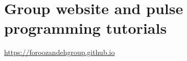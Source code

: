 \section{Group website and pulse programming tutorials}
\label{sec:other__groupwebsite}

\url{https://foroozandehgroup.github.io}
